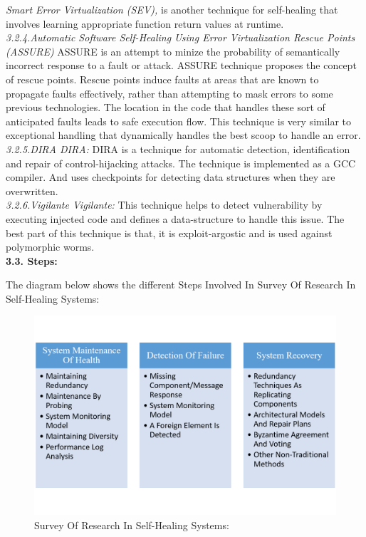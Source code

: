 \textit{Smart Error Virtualization (SEV),} is another technique for self-healing that involves learning appropriate function return values at runtime.\\

\textit{3.2.4.Automatic Software Self-Healing Using Error Virtualization Rescue Points (ASSURE)}
ASSURE is an attempt to minize the probability of semantically incorrect response to a fault or attack. ASSURE technique proposes the concept of rescue points. Rescue points induce faults at areas that are known to propagate faults effectively, rather than attempting to mask errors to some previous technologies. The location in the code that handles these sort of anticipated faults leads to safe execution flow. This technique is very similar to exceptional handling that dynamically handles the best scoop to handle an error.\\

\textit{3.2.5.DIRA DIRA:}
DIRA is a technique for automatic detection, identification and repair of control-hijacking attacks. The technique is implemented as a GCC compiler. And uses checkpoints for detecting data structures when they are overwritten.\\

\textit{3.2.6.Vigilante Vigilante:}
This technique helps to detect vulnerability by executing injected code and defines a data-structure to handle this issue. The best part of this technique is that, it is exploit-argostic and is used against polymorphic worms.\\

\textbf{3.3. Steps:\\}

The diagram below shows the different Steps Involved In Survey Of Research In Self-Healing Systems:

\begin{figure}[H]
\includegraphics[width=5in]{img/SurveyofSelfHeaingResearch}
\caption{Survey Of Research In Self-Healing Systems:}
\end{figure}



